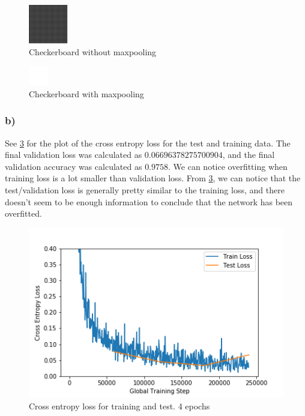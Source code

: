 \begin{figure}[]
    \centering
    \includegraphics{figures/image_processed/checkerboard.png}
    \caption{Checkerboard without maxpooling}
    \label{fig:checkerboard_original}
\end{figure}

\begin{figure}[]
    \centering
    \includegraphics{figures/image_processed/checkerboard_maxpooled.png}
    \caption{Checkerboard with maxpooling}
    \label{fig:checkerboard_maxpooled}
\end{figure}


\newpage
\subsubsection*{b)}
See \cref{fig:task2b} for the plot of the cross entropy loss for the test and training data. The final validation loss was calculated as $0.06696378275700904$, and the final validation accuracy was calculated as $0.9758$. We can notice overfitting when training loss is a lot smaller than validation loss. From \cref{fig:task2b}, we can notice that the test/validation loss is generally pretty similar to the training loss, and there doesn't seem to be enough information to conclude that the network has been overfitted. 

\begin{figure}[]
    \centering
    \includegraphics[width=1.00\textwidth]{figures/image_processed/task2_b.png}
    \caption{Cross entropy loss for training and test. 4 epochs}
    \label{fig:task2b}
\end{figure}

